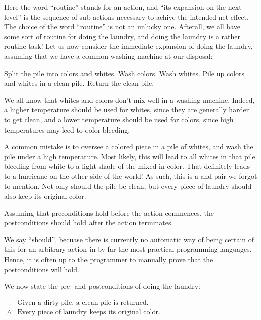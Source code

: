 Here the word ``routine'' stands for an action, and ``its expansion on the next
level'' is the sequence of sub-actions necessary to achive the intended
net-effect. The choice of the word ``routine'' is not an unlucky one. Afterall,
we all have some sort of routine for doing the laundry, and doing the laundry
is a rather routine task! Let us now consider the immediate expansion of doing
the laundry, assuming that we have a common washing machine at our disposal:

\begin{codebox}
\li Split the pile into colors and whites.
\li Wash colors.
\li Wash whites.
\li Pile up colors and whites in a clean pile.
\li Return the clean pile.
\end{codebox}

We all know that whites and colors don't mix well in a washing machine. Indeed,
a higher temperature should be used for whites, since they are generally harder
to get clean, and a lower temperature should be used for colors, since high
temperatures may leed to color bleeding.

A common mistake is to oversee a colored piece in a pile of whites, and wash
the pile under a high temperature.  Most likely, this will lead to all whites
in that pile bleeding from white to a light shade of the mixed-in color. That
definitely leads to a hurricane on the other side of the world!  As such, this
is a  and  pair we forgot to mention. Not only
should the pile be clean, but every piece of laundry should also keep its
original color.

\begin{definition}

Assuming that preconditions hold before the action commences, the
postconditions should hold after the action terminates.

\end{definition}

We say ``should'', becuase there is currently no automatic way of being certain
of this for an arbitrary action in by far the most practical programming
languages. Hence, it is often up to the programmer to manually prove that the
postconditions will hold.

We now state the pre- and postconditions of doing the laundry:

\begin{codebox}
\zi
$\begin{array}{ll}
&\text{Given a dirty pile, a clean pile is returned.}\\
\wedge&\text{Every piece of laundry keeps its original color.}
\end{array}$
\end{codebox}

